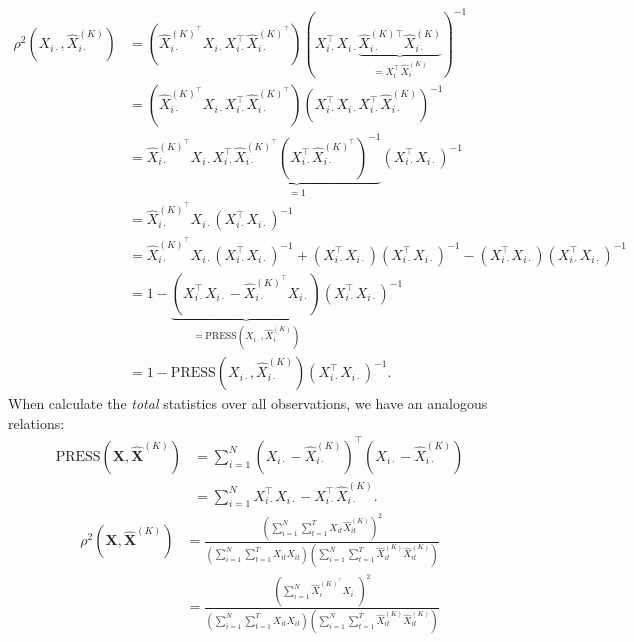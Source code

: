 \begin{align*}
    \rho^2 \left(X_{i\cdot}, \widehat{X}^{(K)}_{i\cdot}\right) 
    &=
    \left(\widehat{X}^{(K)^\top}_{i\cdot}X_{i\cdot} X_{i\cdot}^\top \widehat{X}^{(K)^\top}_{i\cdot} \right)
     \left(X_{i\cdot}^\top X_{i\cdot} \underbrace{\widehat{X}^{(K)\top}_{i\cdot}\widehat{X}^{(K)}_{i\cdot}}_{=X_{i\cdot}^\top \widehat{X}^{(K)}_{i\cdot}} \right)^{-1} \\
     &= 
     \left(\widehat{X}^{(K)^\top}_{i\cdot}X_{i\cdot} X_{i\cdot}^\top \widehat{X}^{(K)^\top}_{i\cdot} \right)
     \left(X_{i\cdot}^\top X_{i\cdot} X_{i\cdot}^\top \widehat{X}^{(K)}_{i\cdot} \right)^{-1} \\
     &=
     \widehat{X}^{(K)^\top}_{i\cdot}X_{i\cdot} \underbrace{X_{i\cdot}^\top \widehat{X}^{(K)^\top}_{i\cdot}
     \left(X_{i\cdot}^\top \widehat{X}^{(K)^\top}_{i\cdot} \right)^{-1}}_{=1}
     \left(X_{i\cdot}^\top X_{i\cdot}\right)^{-1}  \\
     &= \widehat{X}^{(K)^\top}_{i\cdot}X_{i\cdot}  \left(X_{i\cdot}^\top X_{i\cdot}\right)^{-1} \\
     &=
     \widehat{X}^{(K)^\top}_{i\cdot}X_{i\cdot}  \left(X_{i\cdot}^\top X_{i\cdot}\right)^{-1} + 
     \left(X_{i\cdot}^\top X_{i\cdot}\right)  \left(X_{i\cdot}^\top X_{i\cdot}\right)^{-1} -
     \left(X_{i\cdot}^\top X_{i\cdot}\right)  \left(X_{i\cdot}^\top X_{i\cdot}\right)^{-1} \\
     &= 
     1 - \underbrace{\left( X_{i\cdot}^\top X_{i\cdot} - \widehat{X}^{(K)^\top}_{i\cdot}X_{i\cdot} \right)}_{= \text{PRESS}\left(X_{i\cdot}, \widehat{X}^{(K)}_{i\cdot}\right)} \left(X_{i\cdot}^\top X_{i\cdot}\right)^{-1} \\
     &=
     1 - \text{PRESS}\left(X_{i\cdot}, \widehat{X}^{(K)}_{i\cdot}\right) \left(X_{i\cdot}^\top X_{i\cdot}\right)^{-1}.
\end{align*}
When calculate the \emph{total} statistics over all observations, we have an analogous relations:
\begin{align*}
     \text{PRESS}\left(\mathbf{X}, \widehat{\mathbf{X}}^{(K)}\right) &= \sum_{i=1}^N \left(X_{i\cdot} - \widehat{X}^{(K)}_{i\cdot}\right)^\top \left(X_{i\cdot} - \widehat{X}^{(K)}_{i\cdot}\right) \\
     &= \sum_{i=1}^N X_{i\cdot}^\top X_{i\cdot} - X_{i\cdot}^\top \widehat{X}^{(K)}_{i\cdot}.
\end{align*}
\begin{align*}
    \rho^2\left(\mathbf{X}, \widehat{\mathbf{X}}^{(K)}\right)
    &= \frac{\left(\sum_{i=1}^N \sum_{t=1}^T X_{it} \widehat{X}_{it}^{(K)}\right)^2}{
    \left(\sum_{i=1}^N \sum_{t=1}^T X_{it} X_{it}\right)
    \left(\sum_{i=1}^N \sum_{t=1}^T \widehat{X}_{it}^{(K)} \widehat{X}_{it}^{(K)}\right)
    } \\
    &= 
    \frac{\left(\sum_{i=1}^N \widehat{X}^{(K)^\top}_{i\cdot}X_{i\cdot} \right)^2}{
    \left(\sum_{i=1}^N \sum_{t=1}^T X_{it} X_{it}\right)
    \left(\sum_{i=1}^N \sum_{t=1}^T \widehat{X}_{it}^{(K)} \widehat{X}_{it}^{(K)}\right)
    } \\
\end{align*}


